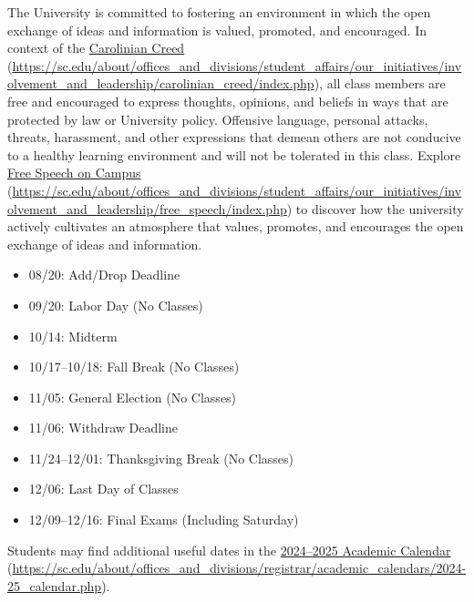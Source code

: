 \documentclass[11pt,letterpaper]{article}
\begin{document}

The University is committed to fostering an environment in which the open exchange of ideas and information is valued, promoted, and encouraged.  In context of the \href{https://sc.edu/about/offices\_and\_divisions/student\_affairs/our\_initiatives/involvement\_and\_leadership/carolinian\_creed/index.php}{Carolinian Creed} (\url{https://sc.edu/about/offices\_and\_divisions/student\_affairs/our\_initiatives/involvement\_and\_leadership/carolinian\_creed/index.php}), all class members are free and encouraged to express thoughts, opinions, and beliefs in ways that are protected by law or University policy. Offensive language, personal attacks, threats, harassment, and other expressions that demean others are not conducive to a healthy learning environment and will not be tolerated in this class. Explore \href{https://sc.edu/about/offices\_and\_divisions/student\_affairs/our\_initiatives/involvement\_and\_leadership/free\_speech/index.php}{Free Speech on Campus} (\url{https://sc.edu/about/offices\_and\_divisions/student\_affairs/our\_initiatives/involvement\_and\_leadership/free\_speech/index.php}) to discover how the university actively cultivates an atmosphere that values, promotes, and encourages the open exchange of ideas and information. \sectionbreak




	\begin{itemize}
	\item 08/20: Add/Drop Deadline
	\item 09/20: Labor Day (No Classes)
	\item 10/14: Midterm
	\item 10/17--10/18: Fall Break (No Classes)
	\item 11/05: General Election (No Classes)
	\item 11/06: Withdraw Deadline
	\item 11/24--12/01: Thanksgiving Break (No Classes)
	\item 12/06: Last Day of Classes
	\item 12/09--12/16: Final Exams (Including Saturday)
	\end{itemize}

Students may find additional useful dates in the \href{https://sc.edu/about/offices\_and\_divisions/registrar/academic\_calendars/2024-25\_calendar.php}{2024--2025 Academic Calendar} (\url{https://sc.edu/about/offices\_and\_divisions/registrar/academic\_calendars/2024-25\_calendar.php}). \sectionbreak
\end{document}
